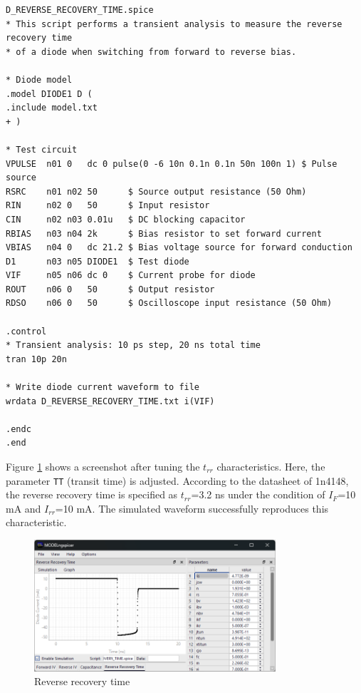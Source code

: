 \documentclass[a4paper,12pt,titlepage]{article}
\begin{document}
\begin{lstlisting}[label=listing13,caption=D\_REVERSE\_RECOVERY\_TIME.spice]
D_REVERSE_RECOVERY_TIME.spice
* This script performs a transient analysis to measure the reverse recovery time
* of a diode when switching from forward to reverse bias.

* Diode model
.model DIODE1 D (
.include model.txt
+ )

* Test circuit
VPULSE  n01 0   dc 0 pulse(0 -6 10n 0.1n 0.1n 50n 100n 1) $ Pulse source
RSRC    n01 n02 50      $ Source output resistance (50 Ohm)
RIN     n02 0   50      $ Input resistor
CIN     n02 n03 0.01u   $ DC blocking capacitor
RBIAS   n03 n04 2k      $ Bias resistor to set forward current
VBIAS   n04 0   dc 21.2 $ Bias voltage source for forward conduction
D1      n03 n05 DIODE1  $ Test diode
VIF     n05 n06 dc 0    $ Current probe for diode
ROUT    n06 0   50      $ Output resistor
RDSO    n06 0   50      $ Oscilloscope input resistance (50 Ohm)

.control
* Transient analysis: 10 ps step, 20 ns total time
tran 10p 20n

* Write diode current waveform to file
wrdata D_REVERSE_RECOVERY_TIME.txt i(VIF)

.endc
.end
\end{lstlisting}

Figure \ref{fig:img08} shows a screenshot after tuning the $t_{rr}$ characteristics.
Here, the parameter \texttt{TT} (transit time) is adjusted. According to the datasheet of 1n4148,
the reverse recovery time is specified as $t_{rr}$=3.2 ns under the condition of $I_F$=10 mA and
$I_{rr}$=10 mA. The simulated waveform successfully reproduces this characteristic.

\begin{figure}[htbp]
    \centering
    \includegraphics[width=0.8\textwidth]{images/img08.png}
    \caption{Reverse recovery time}
    \label{fig:img08}
\end{figure}
\end{document}
